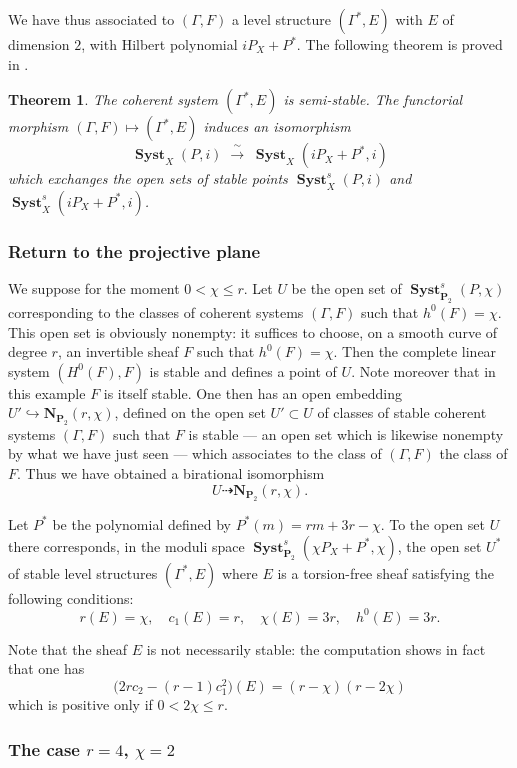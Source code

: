 \documentclass[12pt,english]{smfart}%
\theoremstyle{plain}
\newtheorem{theorem}{Theorem}[section]
\theoremstyle{definition}
\theoremstyle{remark}
\newcommand{\PP}{\mathbf{P}}
\newcommand{\NN}{\mathbf{N}}           %
\DeclareMathOperator{\Syst}{\mathbf{Syst}}
\newcommand{\origpage}[1]{\marginnote{\scriptsize\itshape p.~#1}}
\begin{document}
We have thus associated to $(\Gamma,F)$ a level structure $(\Gamma^{*},E)$ with $E$ of dimension $2$, with Hilbert polynomial $iP_X+P^{*}$. The following theorem is proved in \cite{LeP3}.

\origpage{674}%
\begin{theorem}\label{thm:syst-iso}
The coherent system $(\Gamma^{*},E)$ is semi-stable. The functorial morphism $(\Gamma,F)\mapsto(\Gamma^{*},E)$ induces an isomorphism
\[
\Syst_X(P,i)\;\xrightarrow{\;\sim\;}\;\Syst_X(iP_X+P^{*},i)
\]
which exchanges the open sets of stable points $\Syst^s_X(P,i)$ and $\Syst^s_X(iP_X+P^{*},i)$.
\end{theorem}

\subsubsection*{Return to the projective plane}

We suppose for the moment $0<\chi\le r$. Let $U$ be the open set of $\Syst^s_{\PP_2}(P,\chi)$ corresponding to the classes of coherent systems $(\Gamma,F)$ such that $h^0(F)=\chi$. This open set is obviously nonempty: it suffices to choose, on a smooth curve of degree $r$, an invertible sheaf $F$ such that $h^0(F)=\chi$. Then the complete linear system $(H^0(F),F)$ is stable and defines a point of $U$. Note moreover that in this example $F$ is itself stable. One then has an open embedding $U'\hookrightarrow \NN_{\PP_2}(r,\chi)$, defined on the open set $U'\subset U$ of classes of stable coherent systems $(\Gamma,F)$ such that $F$ is stable --- an open set which is likewise nonempty by what we have just seen --- which associates to the class of $(\Gamma,F)$ the class of $F$. Thus we have obtained a birational isomorphism
\[
U\dashrightarrow \NN_{\PP_2}(r,\chi).
\]

Let $P^{*}$ be the polynomial defined by $P^{*}(m)=rm+3r-\chi$. To the open set $U$ there corresponds, in the moduli space $\Syst^s_{\PP_2}(\chi P_X+P^{*},\chi)$, the open set $U^{*}$ of stable level structures $(\Gamma^{*},E)$ where $E$ is a torsion-free sheaf satisfying the following conditions:
\[
r(E)=\chi,\quad c_1(E)=r,\quad \chi(E)=3r,\quad h^0(E)=3r .
\]

Note that the sheaf $E$ is not necessarily stable: the computation shows in fact that one has
\[
\bigl(2rc_2-(r-1)c_1^2\bigr)(E) = (r-\chi)(r-2\chi)
\]
which is positive only if $0<2\chi\le r$.

\subsubsection*{The case $r=4$, $\chi=2$}
\end{document}
